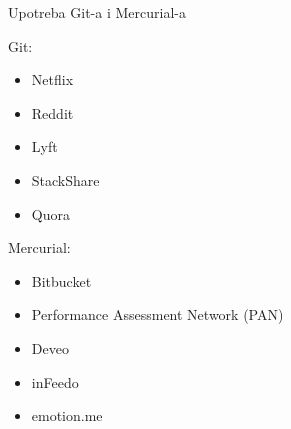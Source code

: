 \documentclass{beamer}
\begin{document}
\begin{frame}{Upotreba Git-a i Mercurial-a}
\begin{multicols}{2}
Git:
\begin{itemize}
    \item Netflix
    \item Reddit 
    \item Lyft
    \item StackShare
    \item Quora
\end{itemize}

\columnbreak
Mercurial:
\begin{itemize}
    \item Bitbucket
    \item Performance Assessment Network (PAN)
    \item Deveo
    \item inFeedo
    \item emotion.me
\end{itemize}

\end{multicols}
\end{frame}
\end{document}
